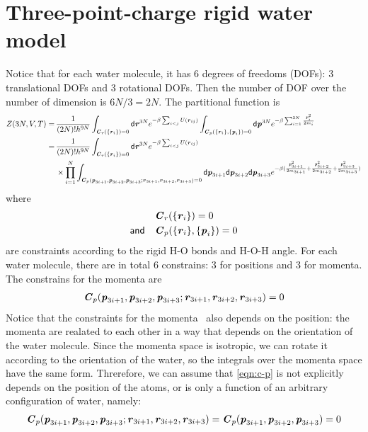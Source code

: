\documentclass[aip,jcp,a4paper,reprint,onecolumn]{revtex4-1}
\newcommand{\vect}[1]{\textbf{\textit{#1}}}
\newcommand{\dd}[0]{\textsf{d}}
\begin{document}
\section{Three-point-charge rigid water model}

Notice that for each water molecule, it has 6 degrees of freedoms (DOFs):
3 translational DOFs and 3 rotational DOFs.
Then the number of DOF over the number of dimension is $6N/3  = 2N$.
The partitional function is 
\begin{align} \nonumber
  Z(3N,V,T)
  =\,&
  \frac{1}{(2N)! h^{9N}}
  \int_{\vect C_r({\{\vect r_i\}}) = 0}\dd\vect r^{3N}
  e^{ -\beta\sum_{i<j} U(\vect r_{ij})}
  \int_{\vect C_p({\{\vect r_i\}, \{\vect p_i\}}) = 0}\dd\vect p^{3N}
  e^{-\beta \sum_{i=1}^{3N}\frac{\vect p_i^2}{2m_i}}\\\nonumber
  =\,&
  \frac{1}{(2N)! h^{9N}}
  \int_{\vect C_r({\{\vect r_i\}}) = 0}\dd\vect r^{3N}
  e^{ -\beta\sum_{i<j} U(\vect r_{ij})}\\\nonumber
  &\times
  \prod_{i=1}^N
  \int_{\vect C_p(\vect p_{3i+1},\vect p_{3i+2}, \vect p_{3i+3}; \vect r_{3i+1},\vect r_{3i+2}, \vect r_{3i+3}) = 0}
  \dd\vect p_{3i+1}\dd\vect p_{3i+2}\dd\vect p_{3i+3}
  e^{-\beta (\frac{\vect p_{3i+1}^2}{2m_{3i+1}} + \frac{\vect p_{3i+2}^2}{2m_{3i+2}} +
    \frac{\vect p_{3i+3}^2}{2m_{3i+3}} )}\\
\end{align}
where
\begin{align}\label{eqn:c-r}
  &\vect C_{r}(\{\vect r_i\}) = 0\\\label{eqn:c-p}
  \textsf{and}\quad &
  \vect C_{p}(\{\vect r_i\}, \{\vect p_i\}) = 0
\end{align}
are constraints according to the rigid H-O bonds and H-O-H angle.
For each water molecule,
there are in total 6 constrains: 3 for positions and 3 for momenta.
The constrains for the momenta are
\begin{align}
  \vect C_p(\vect p_{3i+1},\vect p_{3i+2}, \vect p_{3i+3}; \vect r_{3i+1},\vect r_{3i+2}, \vect r_{3i+3}) = 0
\end{align}
Notice that the constraints for the momenta~\label{eqn:c-p} also depends
on the position: the momenta are realated to each other
in a way that depends on the orientation of the water molecule.
Since the momenta space is isotropic, we can rotate it according to the
orientation of the water, so the integrals over the momenta space have the same
form. Threrefore, we can assume that \eqref{eqn:c-p} is not explicitly
depends on the position of the atoms, or is only a function of an arbitrary
configuration of water, namely:
\begin{align}
  \vect C_{p}(\vect p_{3i+1},\vect p_{3i+2}, \vect p_{3i+3}; \vect r_{3i+1},\vect r_{3i+2}, \vect r_{3i+3})
  =
  \vect C_{p}(\vect p_{3i+1},\vect p_{3i+2}, \vect p_{3i+3}) = 0
\end{align}
\end{document}
